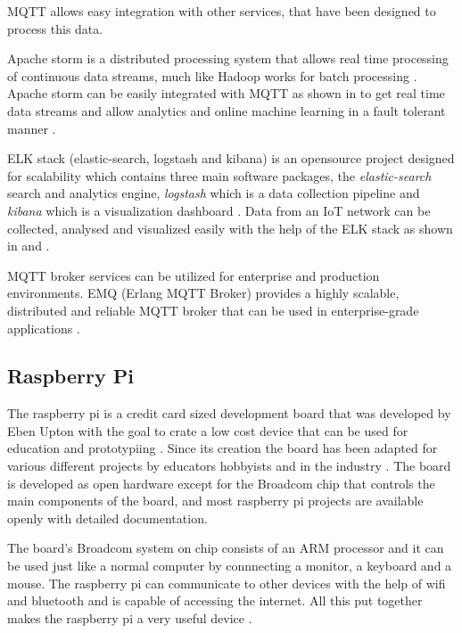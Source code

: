 \documentclass[sigconf]{acmart}
\begin{document}
MQTT allows easy integration with other services, that have
been designed to process this data.

Apache storm is a distributed processing system that allows real time
processing of continuous data streams, much like Hadoop works for
batch processing \cite{apache-storm}. Apache storm can be easily
integrated with MQTT as shown in \cite{apache-storm-mqtt} to get real
time data streams and allow analytics and online machine learning in a
fault tolerant manner \citep{apache-storm-wiki}.

ELK stack (elastic-search, logstash and kibana) is an opensource
project designed for scalability which contains three main software
packages, the {\em elastic-search} search and analytics engine, {\em
  logstash} which is a data collection pipeline and {\em kibana} which
is a visualization dashboard \cite{elk-stack}. Data from an IoT
network can be collected, analysed and visualized easily with the help
of the ELK stack as shown in \cite{mqtt-elasticsearch-setup} and
\cite{kibana-mqtt-analysis}.

MQTT broker services can be utilized for enterprise and production
environments. EMQ (Erlang MQTT Broker) provides a highly scalable,
distributed and reliable MQTT broker that can be used in
enterprise-grade applications \cite{erlang-mqtt-broker}.


\subsection{Raspberry Pi}

The raspberry pi is a credit card sized development board that was developed by Eben Upton with the goal to crate a low cost device that can be used for education and prototypiing \cite{os-pi}. Since its creation the board has been adapted for various different projects by educators hobbyists and in the industry \cite{pi-official}. The board is developed as open hardware except for the Broadcom chip that controls the main components of the board, and most raspberry pi projects are available openly with detailed documentation.

The board's Broadcom system on chip consists of an ARM processor and it can be used just like a normal computer by connnecting a monitor, a keyboard and a mouse. The raspberry pi can communicate to other devices with the help of wifi and bluetooth and is capable of accessing the internet. All this put together makes the raspberry pi a very useful device \cite{pi-official}.
\end{document}
